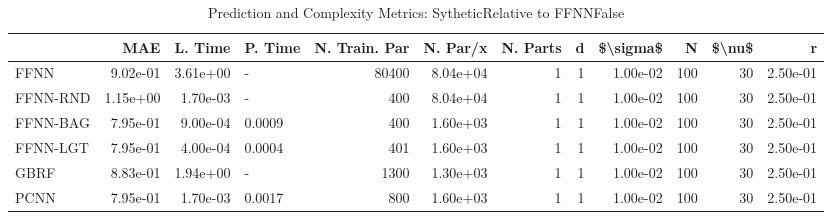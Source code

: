 \begin{table}
\centering
\caption{Prediction and Complexity Metrics: SytheticRelative to FFNNFalse}
\label{tab__Sythetic__Fix_Neurons_QTrue}
\begin{tabular}{lrrlrrrrrrrr}
\toprule
{} &      MAE &  L. Time & P. Time &  N. Train. Par &  N. Par/x &  N. Parts &  d &  \$\textbackslash sigma\$ &    N &  \$\textbackslash nu\$ &        r \\
\midrule
FFNN     & 9.02e-01 & 3.61e+00 &       - &          80400 &  8.04e+04 &         1 &  1 &  1.00e-02 &  100 &     30 & 2.50e-01 \\
FFNN-RND & 1.15e+00 & 1.70e-03 &       - &            400 &  8.04e+04 &         1 &  1 &  1.00e-02 &  100 &     30 & 2.50e-01 \\
FFNN-BAG & 7.95e-01 & 9.00e-04 &  0.0009 &            400 &  1.60e+03 &         1 &  1 &  1.00e-02 &  100 &     30 & 2.50e-01 \\
FFNN-LGT & 7.95e-01 & 4.00e-04 &  0.0004 &            401 &  1.60e+03 &         1 &  1 &  1.00e-02 &  100 &     30 & 2.50e-01 \\
GBRF     & 8.83e-01 & 1.94e+00 &       - &           1300 &  1.30e+03 &         1 &  1 &  1.00e-02 &  100 &     30 & 2.50e-01 \\
PCNN     & 7.95e-01 & 1.70e-03 &  0.0017 &            800 &  1.60e+03 &         1 &  1 &  1.00e-02 &  100 &     30 & 2.50e-01 \\
\bottomrule
\end{tabular}
\end{table}
